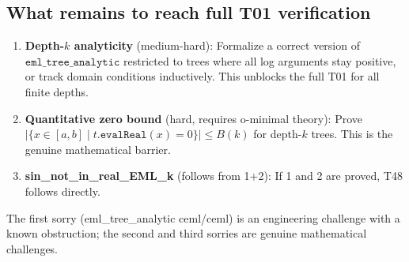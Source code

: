 \documentclass[12pt]{article}
\theoremstyle{definition}
\begin{document}
\subsection{What remains to reach full T01 verification}

\begin{enumerate}
  \item \textbf{Depth-$k$ analyticity} (medium-hard): Formalize a correct version of
        $\texttt{eml\_tree\_analytic}$ restricted to trees where all log arguments stay positive,
        or track domain conditions inductively.  This unblocks the full T01 for all finite depths.
  \item \textbf{Quantitative zero bound} (hard, requires o-minimal theory):
        Prove $|\{x \in [a,b] \mid t.\texttt{evalReal}(x) = 0\}| \leq B(k)$ for depth-$k$ trees.
        This is the genuine mathematical barrier.
  \item \textbf{sin\_not\_in\_real\_EML\_k} (follows from 1+2): If 1 and 2 are proved,
        T48 follows directly.
\end{enumerate}

The first sorry (eml\_tree\_analytic ceml/ceml) is an engineering challenge with a known
obstruction; the second and third sorries are genuine mathematical challenges.
\end{document}
